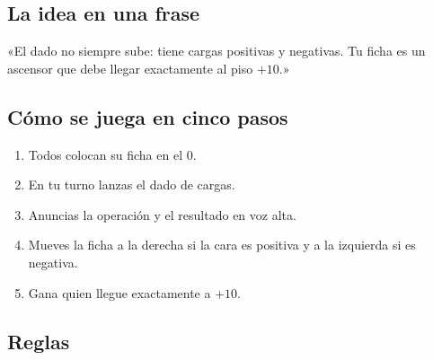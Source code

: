 \documentclass[12pt, letterpaper]{article}
\begin{document}
\subsection{La idea en una frase}

\begin{cuadroextra}
  «El dado no siempre sube: tiene cargas positivas y negativas. Tu ficha es un ascensor que debe llegar exactamente al piso $+10$.»
\end{cuadroextra}

\subsection{Cómo se juega en cinco pasos}

\begin{enumerate}[leftmargin=*]
  \item Todos colocan su ficha en el $0$.
  \item En tu turno lanzas el dado de cargas.
  \item Anuncias la operación y el resultado en voz alta.
  \item Mueves la ficha a la derecha si la cara es positiva y a la izquierda si es negativa.
  \item Gana quien llegue exactamente a $+10$.
\end{enumerate}

\subsection{Reglas}
\end{document}
